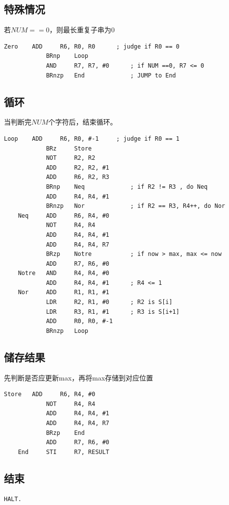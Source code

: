 \documentclass[UTF8]{ctexart}
\begin{document}
\subsection{特殊情况}
若$NUM==0$，则最长重复子串为0
\begin{lstlisting}[basicstyle=\ttfamily,language={[x86masm]Assembler}]
    Zero    ADD     R6, R0, R0      ; judge if R0 == 0 
            BRnp    Loop  
            AND     R7, R7, #0      ; if NUM ==0, R7 <= 0
            BRnzp   End             ; JUMP to End
\end{lstlisting}

\subsection{循环}
    当判断完$NUM$个字符后，结束循环。
\begin{lstlisting}[basicstyle=\ttfamily,language={[x86masm]Assembler}]
    Loop    ADD     R6, R0, #-1     ; judge if R0 == 1
            BRz     Store
            NOT     R2, R2
            ADD     R2, R2, #1
            ADD     R6, R2, R3      
            BRnp    Neq             ; if R2 != R3 , do Neq
            ADD     R4, R4, #1
            BRnzp   Nor             ; if R2 == R3, R4++, do Nor
    Neq     ADD     R6, R4, #0
            NOT     R4, R4
            ADD     R4, R4, #1
            ADD     R4, R4, R7
            BRzp    Notre           ; if now > max, max <= now
            ADD     R7, R6, #0
    Notre   AND     R4, R4, #0
            ADD     R4, R4, #1      ; R4 <= 1
    Nor     ADD     R1, R1, #1
            LDR     R2, R1, #0      ; R2 is S[i]
            LDR     R3, R1, #1      ; R3 is S[i+1]
            ADD     R0, R0, #-1
            BRnzp   Loop
\end{lstlisting}


\subsection{储存结果}
    先判断是否应更新max，再将max存储到对应位置
\begin{lstlisting}[basicstyle=\ttfamily,language={[x86masm]Assembler}]
    Store   ADD     R6, R4, #0
            NOT     R4, R4
            ADD     R4, R4, #1
            ADD     R4, R4, R7
            BRzp    End
            ADD     R7, R6, #0
    End     STI     R7, RESULT
\end{lstlisting}

\subsection{结束}  
\begin{lstlisting}[basicstyle=\ttfamily,language={[x86masm]Assembler}]
    HALT.
\end{lstlisting}
\end{document}
